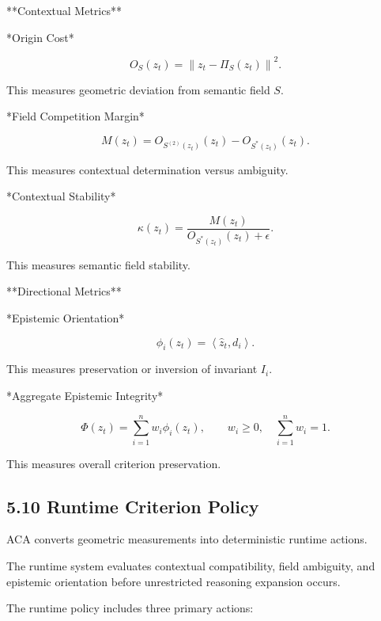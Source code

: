 \documentclass[11pt]{article}
\begin{document}
**Contextual Metrics**

*Origin Cost*

$$
O_S(z_t)
=
\left\lVert z_t-\Pi_S(z_t)\right\rVert^2.
$$

This measures geometric deviation from semantic field $S$.

*Field Competition Margin*

$$
M(z_t)
=
O_{S^{(2)}(z_t)}(z_t)
-
O_{S^{*}(z_t)}(z_t).
$$

This measures contextual determination versus ambiguity.

*Contextual Stability*

$$
\kappa(z_t)
=
\frac{
M(z_t)
}{
O_{S^{*}(z_t)}(z_t)+\epsilon
}.
$$

This measures semantic field stability.

**Directional Metrics**

*Epistemic Orientation*

$$
\phi_i(z_t)
=
\left\langle \hat{z}_t,d_i\right\rangle.
$$

This measures preservation or inversion of invariant $I_i$.

*Aggregate Epistemic Integrity*

$$
\Phi(z_t)
=
\sum_{i=1}^{n}w_i\phi_i(z_t),
\qquad
w_i\geq 0,\quad
\sum_{i=1}^{n}w_i=1.
$$

This measures overall criterion preservation.

\subsection{5.10 Runtime Criterion Policy}

ACA converts geometric measurements into deterministic runtime actions.

The runtime system evaluates contextual compatibility, field ambiguity, and epistemic orientation before unrestricted reasoning expansion occurs.

The runtime policy includes three primary actions:
\end{document}
